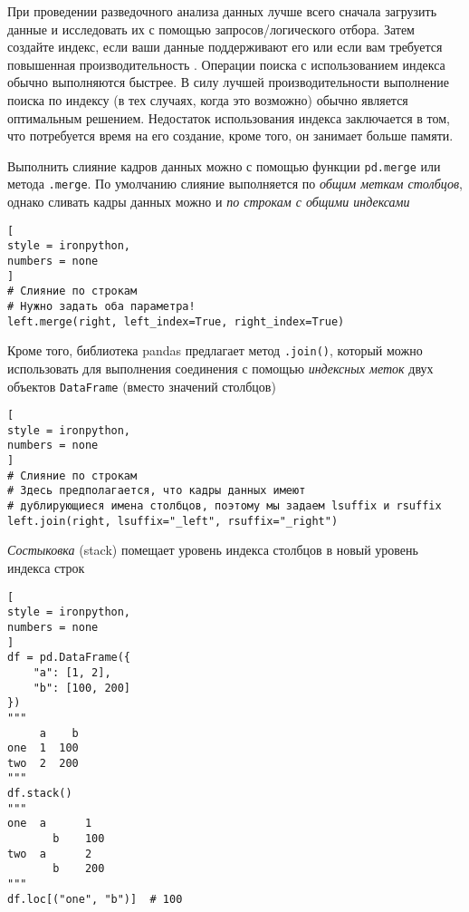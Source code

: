 \documentclass[%
	11pt,
	a4paper,
	utf8,
		]{article}
\begin{document}
При проведении разведочного анализа данных лучше всего сначала загрузить данные и исследовать их с помощью запросов/логического отбора. Затем создайте индекс, если ваши данные поддерживают его или если вам требуется повышенная производительность \cite[]{heydt:pandas-2019}. Операции поиска с использованием индекса обычно выполняются быстрее. В силу лучшей производительности выполнение поиска по индексу (в тех случаях, когда это возможно) обычно является оптимальным решением. Недостаток использования индекса заключается в том, что потребуется время на его создание, кроме того, он занимает больше памяти.

Выполнить слияние кадров данных можно с помощью функции \texttt{pd.merge} или метода \texttt{.merge}. По умолчанию слияние выполняется по \emph{общим меткам столбцов}, однако сливать кадры данных можно и \emph{по строкам с общими индексами} \cite[]{heydt:pandas-2019}
\begin{lstlisting}[
style = ironpython,
numbers = none
]
# Слияние по строкам
# Нужно задать оба параметра!
left.merge(right, left_index=True, right_index=True)
\end{lstlisting}

Кроме того, библиотека pandas предлагает метод \texttt{.join()}, который можно использовать для выполнения соединения с помощью \emph{индексных меток} двух объектов \texttt{DataFrame} (вместо значений столбцов) \cite[]{heydt:pandas-2019}
\begin{lstlisting}[
style = ironpython,
numbers = none
]
# Слияние по строкам
# Здесь предполагается, что кадры данных имеют
# дублирующиеся имена столбцов, поэтому мы задаем lsuffix и rsuffix
left.join(right, lsuffix="_left", rsuffix="_right")
\end{lstlisting}


\emph{Состыковка} (stack) помещает уровень индекса столбцов в новый уровень индекса строк
\begin{lstlisting}[
style = ironpython,
numbers = none
]
df = pd.DataFrame({
    "a": [1, 2],
    "b": [100, 200]
})
"""
     a    b
one  1  100
two  2  200
"""
df.stack()
"""
one  a      1
	   b    100
two  a      2
 	   b    200
"""
df.loc[("one", "b")]  # 100
\end{lstlisting}
\end{document}
